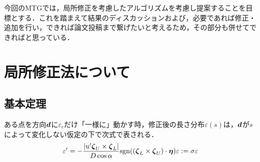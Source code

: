 \documentclass[16.7pt]{jsarticle}
\begin{document}
		
	\articleSPRobj
		今回のMTGでは，局所修正を考慮したアルゴリズムを考慮し提案することを目標とする．これを踏まえて結果のディスカッションおよび，必要であれば修正・追加を行い，できれば論文投稿まで繋げたいと考えるため，その部分も併せてできればと思っている．
		

	\articleSPRitemsone
		
		\tableofcontents
		
		
	\articleSPRitemstwo
	\renewcommand{\labelitemi}{$\blacktriangledown$}
	\newcommand{\argmax}{\mathop{\rm arg~max}\limits}
	\newcommand{\argmin}{\mathop{\rm arg~min}\limits}
	\newcommand{\Ker}{{\rm Ker}}
	\newcommand{\rank}{{\rm rank}}
\section{局所修正法について}
		\subsection{基本定理}
		ある点を方向$ \boldsymbol{d} $に$ \varepsilon_c $だけ「一様に」動かす時，修正後の長さ分布$ \varepsilon(s) $は，$ \boldsymbol{d} $が$ s $によって変化しない仮定の下で次式で表される．
		\begin{equation}\label{eq:varDiffeq}
			\varepsilon' = -\frac{|u'\boldsymbol{\zeta}_U\times \boldsymbol{\zeta}_L|}{D \cos \alpha} \mathrm{sgn}((\boldsymbol{\zeta}_L \times \boldsymbol{\zeta}_U) \cdot \boldsymbol{\eta})\varepsilon := \sigma \varepsilon
		\end{equation}
		
\end{document}
